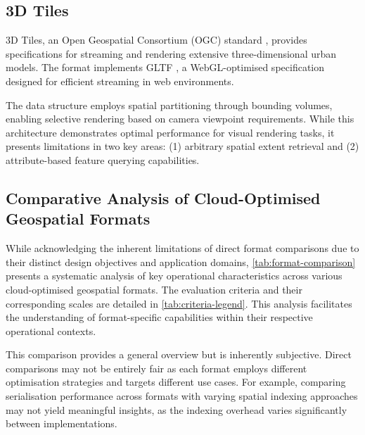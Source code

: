 \subsection{3D Tiles}
\label{rw:cloud_optimised_implementations:3d_tiles}
3D Tiles, an Open Geospatial Consortium (OGC) standard \citep{3d_tiles}, provides specifications for streaming and rendering extensive three-dimensional urban models. The format implements GLTF \citep{gltf}, a WebGL-optimised specification designed for efficient streaming in web environments.

The data structure employs spatial partitioning through bounding volumes, enabling selective rendering based on camera viewpoint requirements. While this architecture demonstrates optimal performance for visual rendering tasks, it presents limitations in two key areas: (1) arbitrary spatial extent retrieval and (2) attribute-based feature querying capabilities.

\subsection{Comparative Analysis of Cloud-Optimised Geospatial Formats}
\label{rw:cloud_optimised_implementations:comparison}
While acknowledging the inherent limitations of direct format comparisons due to their distinct design objectives and application domains, \autoref{tab:format-comparison} presents a systematic analysis of key operational characteristics across various cloud-optimised geospatial formats. The evaluation criteria and their corresponding scales are detailed in \autoref{tab:criteria-legend}. This analysis facilitates the understanding of format-specific capabilities within their respective operational contexts.

This comparison provides a general overview but is inherently subjective. Direct comparisons may not be entirely fair as each format employs different optimisation strategies and targets different use cases. For example, comparing serialisation performance across formats with varying spatial indexing approaches may not yield meaningful insights, as the indexing overhead varies significantly between implementations.

